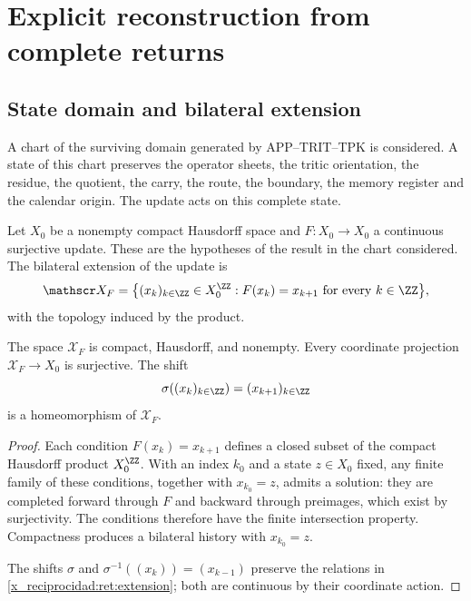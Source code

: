 \chapter{Explicit reconstruction from complete returns}
\label{x_reciprocidad:ret:seccion}

\section{State domain and bilateral extension}

A chart of the surviving domain generated by
APP--TRIT--TPK is considered. A state of this chart preserves the operator sheets,
the tritic orientation, the residue, the quotient, the carry, the route,
the boundary, the memory register and the calendar origin.
The update acts on this complete state.

Let \(X_0\) be a nonempty compact Hausdorff space and
\(F:X_0\to X_0\) a continuous surjective update.
These are the hypotheses of the result in the chart considered.
The bilateral extension of the update is
\begin{equation}
 \mathscr X_F=
 \bigl\{(x_k)_{k\in\ZZ}\in X_0^{\ZZ}:
                  F(x_k)=x_{k+1}\text{ for every }k\in\ZZ\bigr\},
 \label{x_reciprocidad:ret:extension}
\end{equation}
with the topology induced by the product.

\begin{lemma}
\label{x_reciprocidad:ret:existencia}
The space \(\mathscr X_F\) is compact, Hausdorff, and nonempty.
Every coordinate projection \(\mathscr X_F\to X_0\) is surjective.
The shift
\[
 \sigma((x_k)_{k\in\ZZ})=(x_{k+1})_{k\in\ZZ}
\]
is a homeomorphism of \(\mathscr X_F\).
\end{lemma}
\begin{proof}
Each condition \(F(x_k)=x_{k+1}\) defines a closed subset of the compact
Hausdorff product \(X_0^{\ZZ}\).
With an index \(k_0\) and a state \(z\in X_0\) fixed, any finite
family of these conditions, together with \(x_{k_0}=z\), admits a solution:
they are completed forward through \(F\) and backward through
preimages, which exist by surjectivity. The conditions therefore have
the finite intersection property. Compactness produces
a bilateral history with \(x_{k_0}=z\).

The shifts \(\sigma\) and
\(\sigma^{-1}((x_k))=(x_{k-1})\) preserve the relations in
\eqref{x_reciprocidad:ret:extension}; both are continuous by their coordinate action.
\end{proof}

